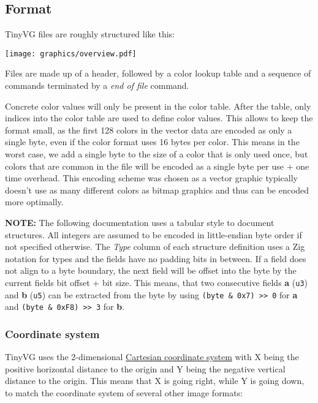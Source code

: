 \documentclass[]{article}
\begin{document}
\hypertarget{format}{\subsection{Format}\label{format}}

TinyVG files are roughly structured like this:

\begin{center}
\texttt{[image: graphics/overview.pdf]}
\end{center}

Files are made up of a header, followed by a color lookup table and a
sequence of commands terminated by a \emph{end of file} command.

Concrete color values will only be present in the color table. After the
table, only indices into the color table are used to define color
values. This allows to keep the format small, as the first 128 colors in
the vector data are encoded as only a single byte, even if the color
format uses 16 bytes per color. This means in the worst case, we add a
single byte to the size of a color that is only used once, but colors
that are common in the file will be encoded as a single byte per use +
one time overhead. This encoding scheme was chosen as a vector graphic
typically doesn't use as many different colors as bitmap graphics and
thus can be encoded more optimally.

\textbf{NOTE:} The following documentation uses a tabular style to
document structures. All integers are assumed to be encoded in
little-endian byte order if not specified otherwise. The \emph{Type}
column of each structure definition uses a Zig notation for types and
the fields have no padding bits in between. If a field does not align to
a byte boundary, the next field will be offset into the byte by the
current fields bit offset + bit size. This means, that two consecutive
fields \textbf{a} (\texttt{u3}) and \textbf{b} (\texttt{u5}) can be
extracted from the byte by using
\texttt{(byte\ \&\ 0x7)\ \textgreater{}\textgreater{}\ 0} for \textbf{a}
and \texttt{(byte\ \&\ 0xF8)\ \textgreater{}\textgreater{}\ 3} for
\textbf{b}.

\hypertarget{coordinate-system}{%
\subsubsection{Coordinate system}\label{coordinate-system}}

TinyVG uses the 2-dimensional \href{https://en.wikipedia.org/wiki/Cartesian_coordinate_system}{Cartesian
coordinate system} with X being the positive horizontal distance to the
origin and Y being the negative vertical distance to the origin. This
means that X is going right, while Y is going down, to match the
coordinate system of several other image formats:
\end{document}
